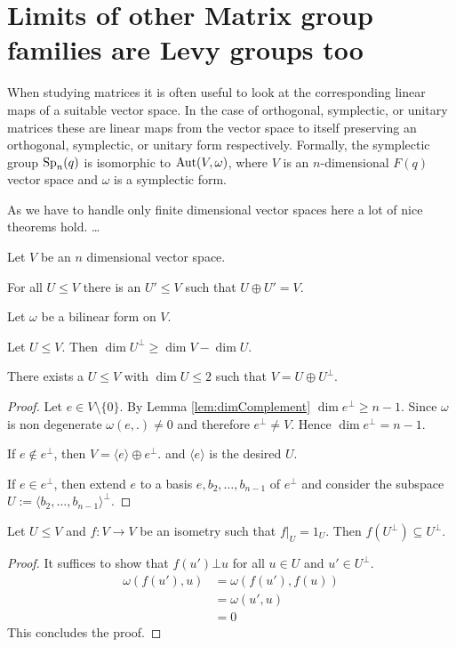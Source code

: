 \section{Limits of other Matrix group families are Levy groups too}
When studying matrices it is often useful to look at the corresponding linear maps of a suitable vector space. In the case of orthogonal, symplectic, or unitary matrices these are linear maps from the vector space to itself preserving an orthogonal, symplectic, or unitary form respectively. Formally, the symplectic group $\operatorname{Sp}_n(q)$ is isomorphic to $\operatorname{Aut}(V,\omega)$, where $V$ is an $n$-dimensional $F(q)$ vector space and $\omega$ is a symplectic form.

As we have to handle only finite dimensional vector spaces here a lot of nice theorems hold. \dots

Let $V$ be an $n$ dimensional vector space.%
\begin{lemma}\label{lem:complementExists}
For all $U\leq V$ there is an $U'\leq V$ such that $U\oplus U'=V$.
\end{lemma}


Let $\omega$ be a bilinear form on $V$.

\begin{lemma}\label{lem:dimComplement}
Let $U\leq V$. Then $\dim U^\bot\geq \dim V-\dim U$.
\end{lemma}

\begin{lemma}
There exists a $U\leq V$ with $\dim U\leq 2$ such that $V=U\oplus U^\bot$.
\end{lemma}
\begin{proof}
Let $e\in V\setminus\{0\}$. By Lemma \ref{lem:dimComplement} $\dim e^\bot\geq n-1$. Since $\omega$ is non degenerate $\omega(e,.)\not=0$ and therefore $e^\bot\not=V$. Hence $\dim e^\bot= n-1$.

If $e\notin e^\bot$, then $V=\langle e\rangle\oplus e^\bot$. and $\langle e\rangle$ is the desired $U$.

If $e\in e^\bot$, then extend $e$ to a basis $e,b_2,\dots,b_{n-1}$ of $e^\bot$ and consider the subspace $U:=\langle b_2,\dots,b_{n-1}\rangle^\bot$.
\end{proof}


\begin{lemma}
Let $U\leq V$ and $f\colon V\to V$ be an isometry such that $f|_U=1_U$. Then $f(U^\bot)\subseteq U^\bot$.
\end{lemma}
\begin{proof}
It suffices to show that $f(u')\bot u$ for all $u\in U$ and $u'\in U^\bot$.
\begin{align*}
\omega(f(u'),u)&=\omega(f(u'),f(u))\\
&=\omega(u',u)\\
&=0
\end{align*}
This concludes the proof.
\end{proof}

